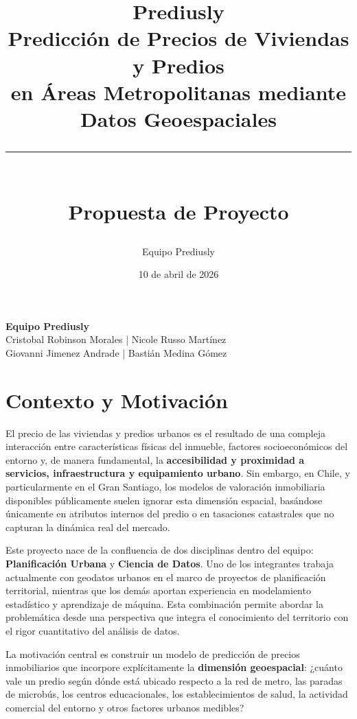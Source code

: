 \documentclass[12pt, letterpaper]{article}
\title{%
  {\LARGE\bfseries\color{primary} Prediusly}\\[0.3em]
  {\large\color{darkgray} Predicción de Precios de Viviendas y Predios\\
   en Áreas Metropolitanas mediante Datos Geoespaciales}\\[0.8em]
  \rule{\linewidth}{1.2pt}\\[0.4em]
  {\normalsize\color{darkgray} Propuesta de Proyecto}
}
\author{\color{darkgray} Equipo Prediusly}
\date{\color{darkgray}10 de abril de 2026}
\begin{document}
\maketitle
\thispagestyle{empty}

\vspace{0.5em}
{\centering\color{darkgray}
\textbf{Equipo Prediusly}\\
Cristobal Robinson Morales | Nicole Russo Martínez \\
Giovanni Jimenez Andrade | Bastián Medina Gómez\par
}

\vspace{1em}


\section{Contexto y Motivación}

El precio de las viviendas y predios urbanos es el resultado de una compleja
interacción entre características físicas del inmueble, factores socioeconómicos
del entorno y, de manera fundamental, la \textbf{accesibilidad y proximidad a
servicios, infraestructura y equipamiento urbano}. Sin embargo, en Chile, y
particularmente en el Gran Santiago, los modelos de valoración inmobiliaria
disponibles públicamente suelen ignorar esta dimensión espacial, basándose
únicamente en atributos internos del predio o en tasaciones catastrales que
no capturan la dinámica real del mercado.

Este proyecto nace de la confluencia de dos disciplinas dentro del equipo:
\textbf{Planificación Urbana} y \textbf{Ciencia de Datos}. Uno de los integrantes
trabaja actualmente con geodatos urbanos en el marco de proyectos de planificación
territorial, mientras que los demás aportan experiencia en modelamiento estadístico
y aprendizaje de máquina. Esta combinación permite abordar la problemática desde
una perspectiva que integra el conocimiento del territorio con el rigor
cuantitativo del análisis de datos.

La motivación central es construir un modelo de predicción de precios inmobiliarios
que incorpore explícitamente la \textbf{dimensión geoespacial}: ¿cuánto vale un
predio según dónde está ubicado respecto a la red de metro, las paradas de
microbús, los centros educacionales, los establecimientos de salud, la actividad
comercial del entorno y otros factores urbanos medibles?
\end{document}

